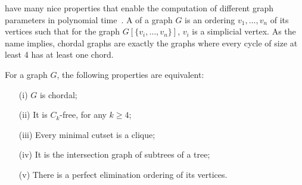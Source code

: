  have many nice properties that enable the computation of different graph parameters in polynomial time~\citep{golumbic}. A  of a graph $G$ is an ordering $v_1, \dots, v_n$ of its vertices such that for the graph $G[\{v_i, \dots, v_n\}]$, $v_i$ is a simplicial vertex. As the name implies, chordal graphs are exactly the graphs where every cycle of size at least 4 has at least one chord. 

\begin{class_definition*}
    For a graph $G$, the following properties are equivalent:
    \begin{itemize}
        \item[(i)] $G$ is chordal;
        \item[(ii)] It is $C_k$-free, for any $k \geq 4$;
        \item[(iii)] Every minimal cutset is a clique;
        \item[(iv)] It is the intersection graph of subtrees of a tree;
        \item[(v)] There is a perfect elimination ordering of its vertices.
    \end{itemize}
\end{class_definition*}

